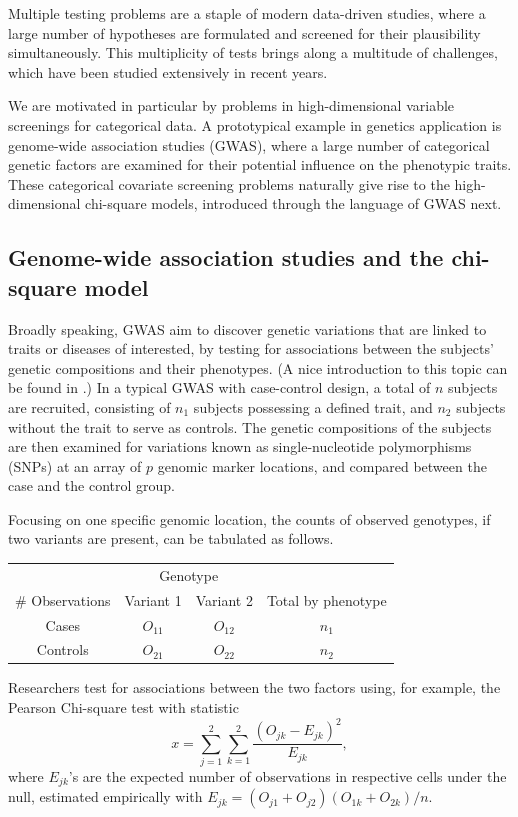 
Multiple testing problems are a staple of modern data-driven studies, where a large number of hypotheses are formulated and screened for their plausibility simultaneously.
This multiplicity of tests brings along a multitude of challenges, which have been studied extensively in recent years.


We are motivated in particular by problems in high-dimensional variable screenings for categorical data. 
A prototypical example in genetics application is genome-wide association studies (GWAS), where a large number of categorical genetic factors are examined for their potential influence on the phenotypic traits.
These categorical covariate screening problems naturally give rise to the high-dimensional chi-square models, introduced through the language of GWAS next.

\subsection{Genome-wide association studies and the chi-square model}
\label{subsec:motivation-chisq}

Broadly speaking, GWAS aim to discover genetic variations that are linked to traits or diseases of interested, by testing for associations between the subjects' genetic compositions and their phenotypes. (A nice introduction to this topic can be found in \citet{bush2012genome}.)
In a typical GWAS with case-control design, a total of $n$ subjects are recruited,  consisting of $n_1$ subjects possessing a defined trait, and $n_2$ subjects without the trait to serve as controls.
The genetic compositions of the subjects are then examined for variations known as single-nucleotide polymorphisms (SNPs) at an array of $p$ genomic marker locations, and compared between the case and the control group.

Focusing on one specific genomic location, the counts of observed genotypes, if two variants are present, can be tabulated as follows.
\begin{center}
    \begin{tabular}{cccc}
    \hline
    & \multicolumn{2}{c}{Genotype} & \\
    \cline{2-3}
    \# Observations & Variant 1 & Variant 2 & Total by phenotype \\
    \hline
    Cases & $O_{11}$ & $O_{12}$ & $n_1$ \\
    Controls & $O_{21}$ & $O_{22}$ & $n_2$ \\
    \hline
    \end{tabular}
\end{center}
Researchers test for associations between the two factors using, for example, the Pearson Chi-square test with statistic
\begin{equation} \label{eq:chisq-statistic}
    x = \sum_{j=1}^2 \sum_{k=1}^2 \frac{(O_{jk} - E_{jk})^2}{E_{jk}},
\end{equation}
where $E_{jk}$'s are the expected number of observations in respective cells under the null, estimated empirically with $E_{jk} = (O_{j1}+O_{j2})(O_{1k}+O_{2k})/n$.

